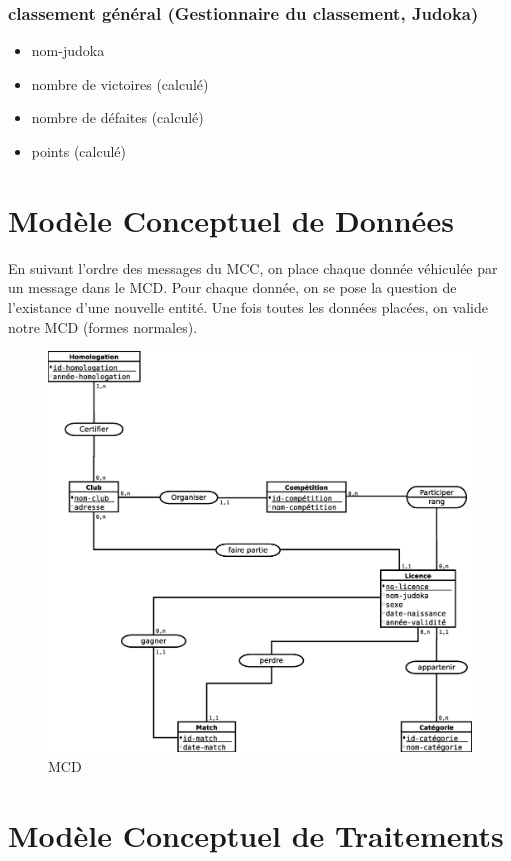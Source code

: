 \subsubsection*{classement général (Gestionnaire du classement, Judoka)}
\begin{itemize}
    \item nom-judoka
    \item nombre de victoires (calculé)
    \item nombre de défaites (calculé)
    \item points (calculé)
\end{itemize}


\newpage
\section*{Modèle Conceptuel de Données}

En suivant l'ordre des messages du MCC, on place chaque donnée véhiculée par un message dans le MCD. Pour chaque donnée, on se pose la question de l'existance d'une nouvelle entité. Une fois toutes les données placées, on valide notre MCD (formes normales).

\begin{figure}[!htb]
    \begin{center}
    \includegraphics[width=11.5cm]{images/cc2_mcd.eps}
    \caption{\label{cc2_mcd} MCD}
    \end{center}
\end{figure}

\newpage
\section*{Modèle Conceptuel de Traitements}

